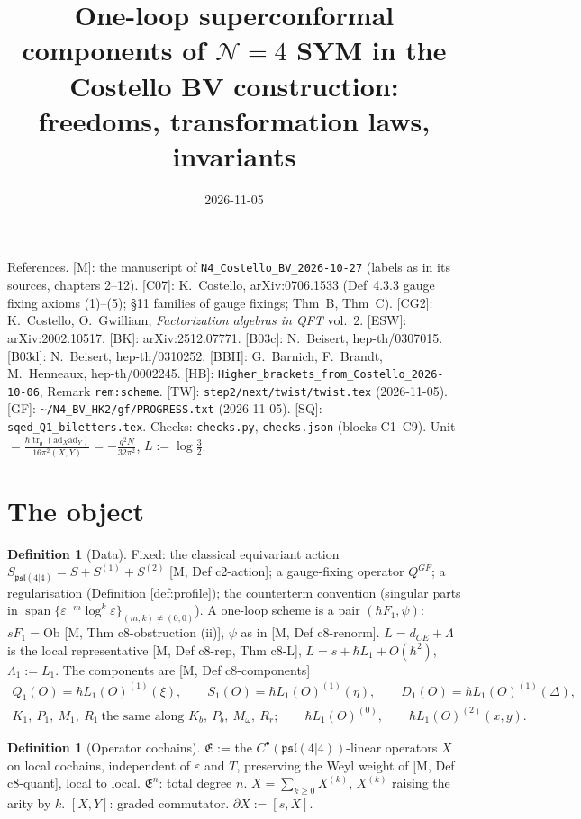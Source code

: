 \documentclass[10pt]{article}
\title{One-loop superconformal components of $\mathcal N=4$ SYM in the Costello BV construction:\\ freedoms, transformation laws, invariants}
\author{}
\date{2026-11-05}
\theoremstyle{definition}
\newtheorem{definition}[theorem]{Definition}
\newcommand{\pl}{\mathfrak{psl}(4|4)}
\newcommand{\E}{\mathfrak E}
\newcommand{\ad}{\mathrm{ad}}
\newcommand{\Ob}{\mathrm{Ob}}
\newcommand{\Lt}{\log\tfrac32}
\begin{document}
\maketitle

\noindent References. [M]: the manuscript of \texttt{N4\_Costello\_BV\_2026-10-27} (labels as in its sources, chapters 2--12). [C07]: K.~Costello, arXiv:0706.1533 (Def~4.3.3 gauge fixing axioms (1)--(5); \S11 families of gauge fixings; Thm~B, Thm~C). [CG2]: K.~Costello, O.~Gwilliam, \emph{Factorization algebras in QFT} vol.~2. [ESW]: arXiv:2002.10517. [BK]: arXiv:2512.07771. [B03c]: N.~Beisert, hep-th/0307015. [B03d]: N.~Beisert, hep-th/0310252. [BBH]: G.~Barnich, F.~Brandt, M.~Henneaux, hep-th/0002245. [HB]: \texttt{Higher\_brackets\_from\_Costello\_2026-10-06}, Remark \texttt{rem:scheme}. [TW]: \texttt{step2/next/twist/twist.tex} (2026-11-05). [GF]: \texttt{\~{}/N4\_BV\_HK2/gf/PROGRESS.txt} (2026-11-05). [SQ]: \texttt{sqed\_Q1\_biletters.tex}. Checks: \texttt{checks.py}, \texttt{checks.json} (blocks C1--C9). Unit $=\frac{\hbar\operatorname{tr}_{\mathfrak g}(\ad_X\ad_Y)}{16\pi^2(X,Y)}=-\frac{g^2N}{32\pi^2}$, $L:=\Lt$.

\section{The object}

\begin{definition}[Data]\label{def:data}
Fixed: the classical equivariant action $S_{\pl}=S+S^{(1)}+S^{(2)}$ [M, Def c2-action]; a gauge-fixing operator $Q^{GF}$; a regularisation (Definition \ref{def:profile}); the counterterm convention (singular parts in $\operatorname{span}\{\varepsilon^{-m}\log^k\varepsilon\}_{(m,k)\ne(0,0)}$). A one-loop scheme is a pair $(\hbar F_1,\psi)$: $sF_1=\Ob$ [M, Thm c8-obstruction (ii)], $\psi$ as in [M, Def c8-renorm]. $L=d_{CE}+\Lambda$ is the local representative [M, Def c8-rep, Thm c8-L], $L=s+\hbar L_1+O(\hbar^2)$, $\Lambda_1:=L_1$. The components are [M, Def c8-components]
\[
\begin{gathered}
Q_1(O)=\hbar L_1(O)^{(1)}(\xi),\qquad S_1(O)=\hbar L_1(O)^{(1)}(\eta),\qquad D_1(O)=\hbar L_1(O)^{(1)}(\Delta),\\
K_1,\ P_1,\ M_1,\ R_1\ \text{the same along }K_b,\ P_b,\ M_\omega,\ R_r;\qquad \hbar L_1(O)^{(0)},\qquad \hbar L_1(O)^{(2)}(x,y).
\end{gathered}
\]
\end{definition}

\begin{definition}[Operator cochains]\label{def:E}
$\E$ := the $C^\bullet(\pl)$-linear operators $X$ on local cochains, independent of $\varepsilon$ and $T$, preserving the Weyl weight of [M, Def c8-quant], local to local. $\E^n$: total degree $n$. $X=\sum_{k\ge0}X^{(k)}$, $X^{(k)}$ raising the arity by $k$. $[X,Y]$: graded commutator. $\partial X:=[s,X]$.
\end{definition}
\end{document}
